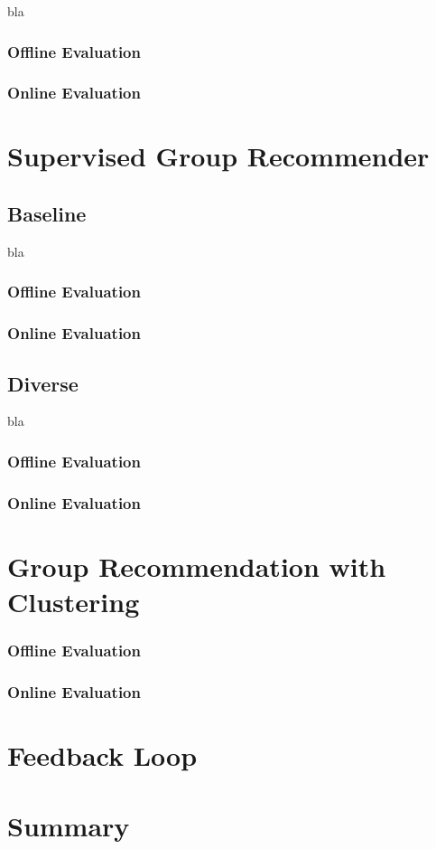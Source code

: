 bla

\subsubsection{Offline Evaluation}

\subsubsection{Online Evaluation}


\section{Supervised Group Recommender}

\subsection{Baseline}

bla

\subsubsection{Offline Evaluation}

\subsubsection{Online Evaluation}



\subsection{Diverse}

bla 

\subsubsection{Offline Evaluation}

\subsubsection{Online Evaluation}

\section{Group Recommendation with Clustering}

\subsubsection{Offline Evaluation}

\subsubsection{Online Evaluation}


\section{Feedback Loop}\label{section:eval-feedback}


\section{Summary}


